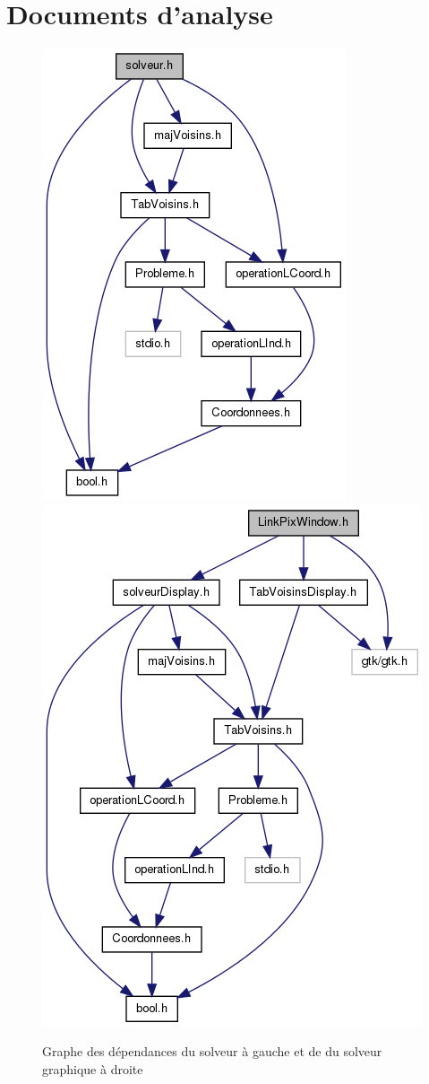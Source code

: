 \chapter{Documents d’analyse}

\begin{figure}[h]
  \centering
  \includegraphics[scale=0.5]{solveur-dependance}
  \includegraphics[scale=0.5]{link-pix-window-dependance}
  \caption{Graphe des dépendances du solveur à gauche et de du solveur graphique à droite}
  \label{graphes-dependance}
\end{figure}

